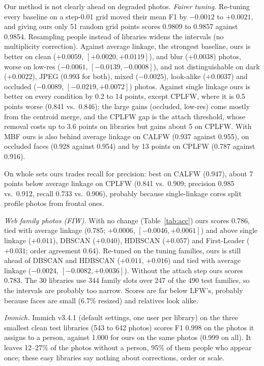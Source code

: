 \documentclass[conference]{IEEEtran}
\begin{document}
Our method is not clearly ahead on degraded photos. \emph{Fairer tuning.} Re-tuning every baseline on a step-0.01 grid
moved their mean F1 by $-0.0012$ to $+0.0021$, and giving ours only 51 random grid points scores 0.9809 to 0.9857 against 0.9854.
Resampling people instead of libraries widens the intervals (no multiplicity correction). Against average linkage, the strongest baseline, ours is better on clean
($+0.0059$, $[+0.0020,+0.0119]$), and blur ($+0.0038$) photos, worse on low-res ($-0.0061$,
$[-0.0139,-0.0008]$), and not distinguishable on dark ($+0.0022$), JPEG (0.993 for both), mixed ($-0.0025$), look-alike ($+0.0037$) and occluded ($-0.0089$,
$[-0.0219,+0.0072]$) photos. Against single linkage ours is better on every condition by 0.2 to 14 points,
except CPLFW, where it is 0.5 points worse (0.841 vs.\ 0.846); the large gains (occluded, low-res) come mostly from the centroid merge, and the CPLFW gap is the attach threshold, whose removal costs up to
3.6 points on libraries but gains about 5 on CPLFW. With MBF ours is also behind average linkage on CALFW (0.937 against 0.955), on occluded
faces (0.928 against 0.954) and by 13 points on CPLFW (0.787 against 0.916).

On whole sets ours trades recall for precision: best on CALFW (0.947), about 7 points below average linkage on CPLFW (0.841 vs.\
0.909; precision 0.985 vs.\ 0.912, recall 0.733 vs.\ 0.906), probably because single-linkage cores split profile photos from frontal
ones.

\emph{Web family photos (FIW).} With no change (Table~\ref{tab:acc}) ours scores 0.786, tied with average linkage (0.785;
$+0.0006$, $[-0.0046,+0.0061]$) and above single linkage ($+0.011$), DBSCAN ($+0.040$), HDBSCAN ($+0.057$) and
First-Leader ($+0.031$; order agreement 0.64). Re-tuned on the tuning families, ours is still ahead of DBSCAN and HDBSCAN
($+0.011$, $+0.016$) and tied with average linkage ($-0.0024$, $[-0.0082,+0.0036]$). Without the attach step ours scores
0.783. The 30 libraries use 344 family slots over 247 of the 490 test families, so the intervals are
probably too narrow. Scores are far below LFW's, probably because faces are small (6.7\% resized) and relatives look alike.

\emph{Immich.} Immich v3.4.1 (default settings, one user per library) on the three smallest clean test libraries (543 to 642 photos) scores F1 0.998 on the
photos it assigns to a person, against 1.000 for ours on the same photos (0.999 on all). It leaves 12--27\% of the photos without a person, 95\% of them
people who appear once; these easy libraries say nothing about corrections, order or scale.
\end{document}
